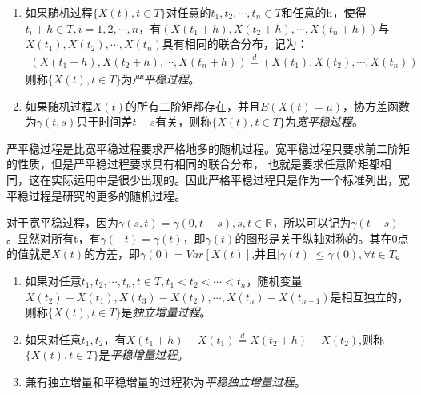\begin{definition}\label{def:SmoothStoPro}
	\begin{enumerate}[\bfseries (1)]
		\item 如果随机过程\(\{X(t),t\in T\}\)对任意的\(t_1,t_2,\cdots,t_n \in T\)和任意的h，使得\(t_i+h\in T,i=1,2,\cdots,n\)，有\((X(t_1+h),X(t_2+h),\cdots,X(t_n+h))\)与\(X(t_1),X(t_2),\cdots,X(t_n)\)具有相同的联合分布，记为：
		      \begin{align*}
			      (X(t_1+h),X(t_2+h),\cdots,X(t_n+h))\overset{d}{=}(X(t_1),X(t_2),\cdots,X(t_n))
		      \end{align*}
		      则称\(\{X(t),t\in T\}\)为\emph{严平稳过程}。
		\item 如果随机过程\(X(t)\)的所有二阶矩都存在，并且\(E(X(t)=\mu)\)，协方差函数为\(\gamma(t,s)\)只于时间差\(t-s\)有关，则称\(\{X(t),t\in T\}\)为\emph{宽平稳过程}。
	\end{enumerate}
\end{definition}

严平稳过程是比宽平稳过程要求严格地多的随机过程。宽平稳过程只要求前二阶矩的性质，但是严平稳过程要求具有相同的联合分布，
也就是要求任意阶矩都相同，这在实际运用中是很少出现的。因此严格平稳过程只是作为一个标准列出，宽平稳过程是研究的更多的随机过程。

对于宽平稳过程，因为\(\gamma(s,t)=\gamma(0,t-s),s,t\in \mathbb{R}\)，所以可以记为\(\gamma(t-s)\)。显然对所有t，有\(\gamma(-t)=\gamma(t)\)，即\(\gamma(t)\)的图形是关于纵轴对称的。其在0点的值就是\(X(t)\)的方差，即\(\gamma(0)=Var[X(t)]\),并且\(\lvert \gamma(t)\rvert\leqslant\gamma(0),\forall t\in T\)。

\begin{definition}\label{def:SmoIndIncPro}
	\begin{enumerate}[\bfseries (1)]
		\item 如果对任意\(t_1,t_2,\cdots,t_n,t\in T, t_1<t_2<\cdots<t_n\)，随机变量\(X(t_2)-X(t_1),X(t_3)-X(t_2),\cdots,X(t_n)-X(t_{n-1})\)是相互独立的，则称\(\{X(t),t\in T\}\)是\emph{独立增量过程}。
		\item 	如果对任意\(t_1,t_2\)，有\(X(t_1+h)-X(t_1)\overset{d}{=}X(t_2+h)-X(t_2)\),则称\(\{X(t),t\in T\}\)是\emph{平稳增量过程}。
		\item 	兼有独立增量和平稳增量的过程称为\emph{平稳独立增量过程}。
	\end{enumerate}
\end{definition}

